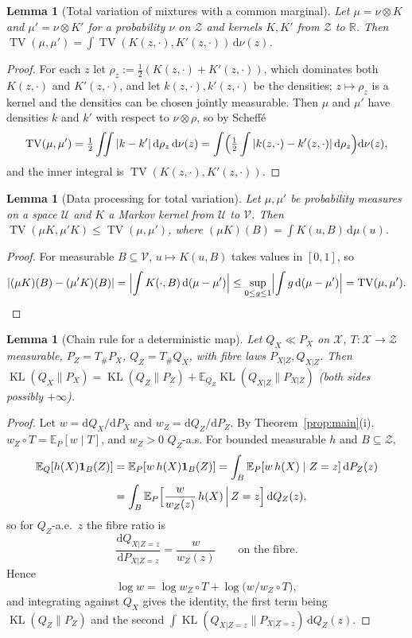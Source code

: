 \documentclass[11pt,a4paper]{article}
\newcommand{\PX}{P_X}
\newcommand{\QX}{Q_X}
\newcommand{\E}{\mathbb{E}}
\newcommand{\R}{\mathbb{R}}
\newcommand{\TV}{\operatorname{TV}}
\newcommand{\KL}{\operatorname{KL}}
\newcommand{\Zc}{\mathcal Z}
\newcommand{\ind}{\mathbf 1}
\theoremstyle{plain}
\newtheorem{lemma}[theorem]{Lemma}
\theoremstyle{definition}
\theoremstyle{remark}
\begin{document}
\begin{lemma}[Total variation of mixtures with a common marginal]\label{lem:tvmix}
Let $\mu=\nu\otimes K$ and $\mu'=\nu\otimes K'$ for a probability $\nu$ on $\Zc$ and kernels $K,K'$ from $\Zc$ to $\R$. Then $\TV(\mu,\mu')=\int\TV(K(z,\cdot),K'(z,\cdot))\,\mathrm d\nu(z)$.
\end{lemma}
\begin{proof}
For each $z$ let $\rho_z:=\tfrac12(K(z,\cdot)+K'(z,\cdot))$, which dominates both $K(z,\cdot)$ and $K'(z,\cdot)$, and let $k(z,\cdot),k'(z,\cdot)$ be the densities; $z\mapsto\rho_z$ is a kernel and the densities can be chosen jointly measurable. Then $\mu$ and $\mu'$ have densities $k$ and $k'$ with respect to $\nu\otimes\rho$, so by Scheff\'e
\[
\TV(\mu,\mu')=\tfrac12\iint|k-k'|\,\mathrm d\rho_z\,\mathrm d\nu(z)=\int\Bigl(\tfrac12\int|k(z,\cdot)-k'(z,\cdot)|\,\mathrm d\rho_z\Bigr)\mathrm d\nu(z),
\]
and the inner integral is $\TV(K(z,\cdot),K'(z,\cdot))$.
\end{proof}

\begin{lemma}[Data processing for total variation]\label{lem:dp}
Let $\mu,\mu'$ be probability measures on a space $\mathcal U$ and $K$ a Markov kernel from $\mathcal U$ to $\mathcal V$. Then $\TV(\mu K,\mu'K)\le\TV(\mu,\mu')$, where $(\mu K)(B)=\int K(u,B)\,\mathrm d\mu(u)$.
\end{lemma}
\begin{proof}
For measurable $B\subseteq\mathcal V$, $u\mapsto K(u,B)$ takes values in $[0,1]$, so
\[
|(\mu K)(B)-(\mu'K)(B)|=\Bigl|\int K(\cdot,B)\,\mathrm d(\mu-\mu')\Bigr|\le\sup_{0\le g\le1}\Bigl|\int g\,\mathrm d(\mu-\mu')\Bigr|=\TV(\mu,\mu').
\]
\end{proof}

\begin{lemma}[Chain rule for a deterministic map]\label{lem:chain}
Let $\QX\ll\PX$ on $\mathcal X$, $T:\mathcal X\to\Zc$ measurable, $P_Z=T_\#\PX$, $Q_Z=T_\#\QX$, with fibre laws $P_{X|Z},Q_{X|Z}$. Then $\KL(\QX\|\PX)=\KL(Q_Z\|P_Z)+\E_{Q_Z}\KL(Q_{X|Z}\|P_{X|Z})$ (both sides possibly $+\infty$).
\end{lemma}
\begin{proof}
Let $w=\mathrm d\QX/\mathrm d\PX$ and $w_Z=\mathrm dQ_Z/\mathrm dP_Z$. By Theorem~\ref{prop:main}(i), $w_Z\circ T=\E_P[w\mid T]$, and $w_Z>0$ $Q_Z$-a.s. For bounded measurable $h$ and $B\subseteq\Zc$,
\begin{align*}
\E_Q[h(X)\ind_B(Z)]&=\E_P[w\,h(X)\ind_B(Z)]=\int_B\E_P[w\,h(X)\mid Z=z]\,\mathrm dP_Z(z)\\
&=\int_B\E_P\Bigl[\frac{w}{w_Z(z)}\,h(X)\,\Big|\,Z=z\Bigr]\,\mathrm dQ_Z(z),
\end{align*}
so for $Q_Z$-a.e.\ $z$ the fibre ratio is
\[
\frac{\mathrm dQ_{X|Z=z}}{\mathrm dP_{X|Z=z}}=\frac{w}{w_Z(z)}\qquad\text{on the fibre}.
\]
Hence
\[
\log w=\log w_Z\circ T+\log\bigl(w/w_Z\circ T\bigr),
\]
and integrating against $\QX$ gives the identity, the first term being $\KL(Q_Z\|P_Z)$ and the second $\int\KL(Q_{X|Z=z}\|P_{X|Z=z})\,\mathrm dQ_Z(z)$.
\end{proof}
\end{document}
